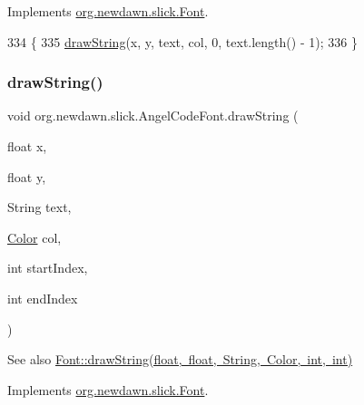Implements \mbox{\hyperlink{interfaceorg_1_1newdawn_1_1slick_1_1_font_afa84859277995b6537d940e466d9f011}{org.\+newdawn.\+slick.\+Font}}.


\begin{DoxyCode}
334                                                                      \{
335         \mbox{\hyperlink{classorg_1_1newdawn_1_1slick_1_1_angel_code_font_a8cc06c81dd2f11c47844d863a03e3433}{drawString}}(x, y, text, col, 0, text.length() - 1);
336     \}
\end{DoxyCode}
\mbox{\label{classorg_1_1newdawn_1_1slick_1_1_angel_code_font_abed0e6374eb587d6a49f3f33e69f34c0}} 
\subsubsection{\texorpdfstring{draw\+String()}{drawString()}\hspace{0.1cm}{\footnotesize\ttfamily [3/3]}}
{\footnotesize\ttfamily void org.\+newdawn.\+slick.\+Angel\+Code\+Font.\+draw\+String (\begin{DoxyParamCaption}\item[{float}]{x,  }\item[{float}]{y,  }\item[{String}]{text,  }\item[{\mbox{\hyperlink{classorg_1_1newdawn_1_1slick_1_1_color}{Color}}}]{col,  }\item[{int}]{start\+Index,  }\item[{int}]{end\+Index }\end{DoxyParamCaption})\hspace{0.3cm}{\ttfamily [inline]}}

\begin{DoxySeeAlso}{See also}
\mbox{\hyperlink{interfaceorg_1_1newdawn_1_1slick_1_1_font_a81ec0a184b55c2f7860d2644bc0731cf}{Font\+::draw\+String(float, float, String, Color, int, int)}} 
\end{DoxySeeAlso}


Implements \mbox{\hyperlink{interfaceorg_1_1newdawn_1_1slick_1_1_font_a81ec0a184b55c2f7860d2644bc0731cf}{org.\+newdawn.\+slick.\+Font}}.


